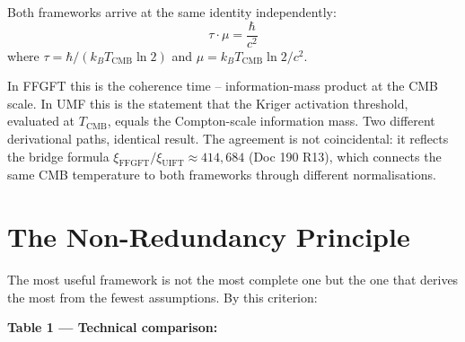Both frameworks arrive at the same identity independently:
\begin{equation}
  \tau \cdot \mu = \frac{\hbar}{c^2}
  \tag{244.7}
\end{equation}
where $\tau = \hbar/(k_B T_\text{CMB}\ln 2)$ and $\mu = k_B T_\text{CMB}\ln 2/c^2$.

In FFGFT this is the coherence time -- information-mass product at the CMB scale.
In UMF this is the statement that the Kriger activation threshold, evaluated at
$T_\text{CMB}$, equals the Compton-scale information mass. Two different
derivational paths, identical result. The agreement is not coincidental:
it reflects the bridge formula $\xi_\text{FFGFT}/\xi_\text{UIFT} \approx 414{,}684$
(Doc 190 R13), which connects the same CMB temperature to both frameworks
through different normalisations.

\section{The Non-Redundancy Principle}

The most useful framework is not the most complete one but the one that
derives the most from the fewest assumptions. By this criterion:

\textbf{Table 1 — Technical comparison:}

\begin{center}
\renewcommand{\arraystretch}{1.4}
{\small
{}
}
\end{center}

